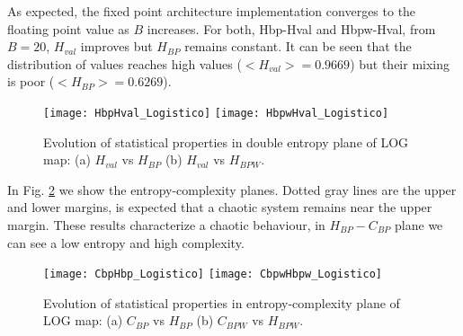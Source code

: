As expected, the fixed point architecture implementation converges to the floating point value as $B$ increases.
For both, Hbp-Hval and Hbpw-Hval, from $B=20$, $H_{val}$ improves but $H_{BP}$ remains constant.
It can be seen that the distribution of values reaches high values ($<H_{val}>=0.9669$) but their mixing is poor ($<H_{BP}>=0.6269$).

\begin{figure}
	\texttt{[image: HbpHval\_Logistico]}
	\texttt{[image: HbpwHval\_Logistico]}
	\caption{Evolution of statistical properties in double entropy plane of LOG map: (a) $H_{val}$ vs $H_{BP}$ (b) $H_{val}$ vs $H_{BPW}$.}
	\label{fig:LOG_HH}
\end{figure}

In Fig. \ref{fig:LOG_HC} we show the entropy-complexity planes.
Dotted gray lines are the upper and lower margins, is expected that a chaotic system remains near the upper margin.
These results characterize a chaotic behaviour, in $H_{BP}-C_{BP}$ plane we can see a low entropy and high complexity.

\begin{figure}
	\texttt{[image: CbpHbp\_Logistico]}
	\texttt{[image: CbpwHbpw\_Logistico]}
	\caption{Evolution of statistical properties in entropy-complexity plane of LOG map: (a) $C_{BP}$ vs $H_{BP}$ (b) $C_{BPW}$ vs $H_{BPW}$.}
	\label{fig:LOG_HC}
\end{figure}
